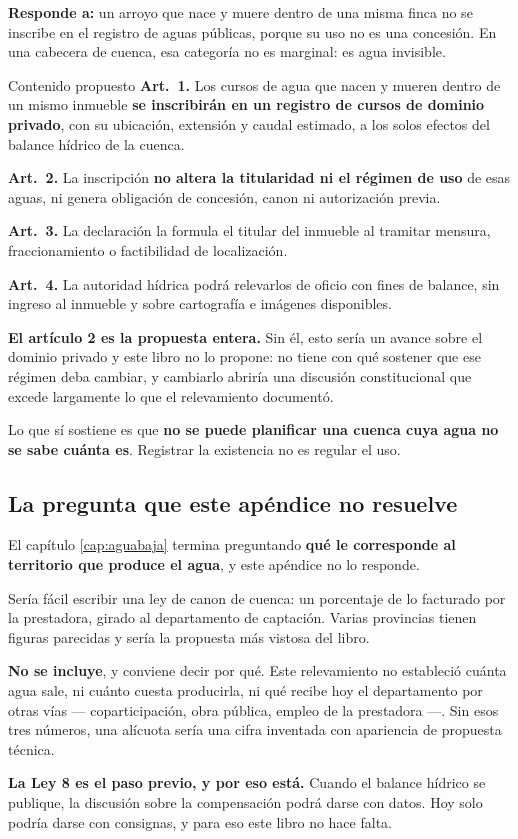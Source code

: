 \textbf{Responde a:} un arroyo que nace y muere dentro de una misma finca no se inscribe en el
registro de aguas públicas, porque su uso no es una concesión. En una cabecera de cuenca, esa
categoría no es marginal: es agua invisible.

\begin{ficha}{Contenido propuesto}
\textbf{Art.\ 1.} Los cursos de agua que nacen y mueren dentro de un mismo inmueble
\textbf{se inscribirán en un registro de cursos de dominio privado}, con su ubicación,
extensión y caudal estimado, a los solos efectos del balance hídrico de la cuenca.

\textbf{Art.\ 2.} La inscripción \textbf{no altera la titularidad ni el régimen de uso} de
esas aguas, ni genera obligación de concesión, canon ni autorización previa.

\textbf{Art.\ 3.} La declaración la formula el titular del inmueble al tramitar mensura,
fraccionamiento o factibilidad de localización.

\textbf{Art.\ 4.} La autoridad hídrica podrá relevarlos de oficio con fines de balance, sin
ingreso al inmueble y sobre cartografía e imágenes disponibles.
\end{ficha}

\begin{cautela}
\textbf{El artículo 2 es la propuesta entera.} Sin él, esto sería un avance sobre el dominio
privado y este libro no lo propone: no tiene con qué sostener que ese régimen deba cambiar, y
cambiarlo abriría una discusión constitucional que excede largamente lo que el relevamiento
documentó.

Lo que sí sostiene es que \textbf{no se puede planificar una cuenca cuya agua no se sabe
cuánta es}. Registrar la existencia no es regular el uso.
\end{cautela}

\subsection{La pregunta que este apéndice no resuelve}

\begin{cautela}
El capítulo \ref{cap:aguabaja} termina preguntando \textbf{qué le corresponde al territorio
que produce el agua}, y este apéndice no lo responde.

Sería fácil escribir una ley de canon de cuenca: un porcentaje de lo facturado por la
prestadora, girado al departamento de captación. Varias provincias tienen figuras parecidas y
sería la propuesta más vistosa del libro.

\textbf{No se incluye}, y conviene decir por qué. Este relevamiento no estableció cuánta agua
sale, ni cuánto cuesta producirla, ni qué recibe hoy el departamento por otras vías --- coparticipación,
obra pública, empleo de la prestadora ---. Sin esos tres números, una alícuota sería una cifra
inventada con apariencia de propuesta técnica.

\textbf{La Ley 8 es el paso previo, y por eso está.} Cuando el balance hídrico se publique, la
discusión sobre la compensación podrá darse con datos. Hoy solo podría darse con consignas, y
para eso este libro no hace falta.
\end{cautela}


